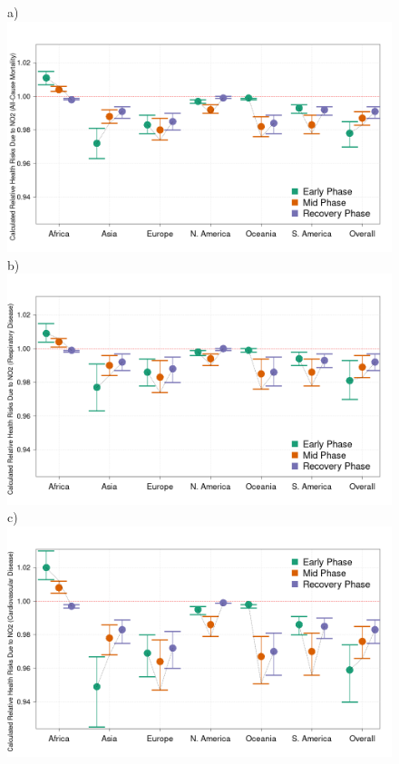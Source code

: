 \documentclass[preprint,10pt]{elsarticle} %
\begin{document}
\begin{figure}
\centering
\scriptsize{a})\includegraphics[trim={0 0 25 23},clip,scale=0.23]{Images/no2All_20250207.png}
\scriptsize{b})\includegraphics[trim={0 0 25 23},clip,scale=0.23]{Images/no2Res_20250207.png}
\\
\scriptsize{c)}\includegraphics[trim={0 0 25 23},clip,scale=0.23]{Images/no2Car_20250207.png}

\end{figure}
\end{document}
